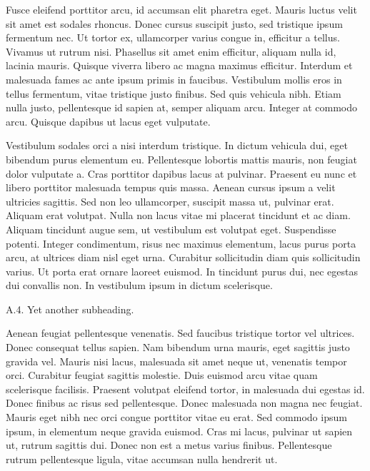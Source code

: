 \documentclass[11pt, notitlepage]{article} %
\begin{document}
Fusce eleifend porttitor arcu, id accumsan elit pharetra eget. Mauris luctus velit sit amet est sodales rhoncus. Donec cursus suscipit justo, sed tristique ipsum fermentum nec. Ut tortor ex, ullamcorper varius congue in, efficitur a tellus. Vivamus ut rutrum nisi. Phasellus sit amet enim efficitur, aliquam nulla id, lacinia mauris. Quisque viverra libero ac magna maximus efficitur. Interdum et malesuada fames ac ante ipsum primis in faucibus. Vestibulum mollis eros in tellus fermentum, vitae tristique justo finibus. Sed quis vehicula nibh. Etiam nulla justo, pellentesque id sapien at, semper aliquam arcu. Integer at commodo arcu. Quisque dapibus ut lacus eget vulputate.

Vestibulum sodales orci a nisi interdum tristique. In dictum vehicula dui, eget bibendum purus elementum eu. Pellentesque lobortis mattis mauris, non feugiat dolor vulputate a. Cras porttitor dapibus lacus at pulvinar. Praesent eu nunc et libero porttitor malesuada tempus quis massa. Aenean cursus ipsum a velit ultricies sagittis. Sed non leo ullamcorper, suscipit massa ut, pulvinar erat. Aliquam erat volutpat. Nulla non lacus vitae mi placerat tincidunt et ac diam. Aliquam tincidunt augue sem, ut vestibulum est volutpat eget. Suspendisse potenti. Integer condimentum, risus nec maximus elementum, lacus purus porta arcu, at ultrices diam nisl eget urna. Curabitur sollicitudin diam quis sollicitudin varius. Ut porta erat ornare laoreet euismod. In tincidunt purus dui, nec egestas dui convallis non. In vestibulum ipsum in dictum scelerisque.

\begin{description}
	\item[A.4. Yet another subheading.]{}
\end{description}

Aenean feugiat pellentesque venenatis. Sed faucibus tristique tortor vel ultrices. Donec consequat tellus sapien. Nam bibendum urna mauris, eget sagittis justo gravida vel. Mauris nisi lacus, malesuada sit amet neque ut, venenatis tempor orci. Curabitur feugiat sagittis molestie. Duis euismod arcu vitae quam scelerisque facilisis. Praesent volutpat eleifend tortor, in malesuada dui egestas id. Donec finibus ac risus sed pellentesque. Donec malesuada non magna nec feugiat. Mauris eget nibh nec orci congue porttitor vitae eu erat. Sed commodo ipsum ipsum, in elementum neque gravida euismod. Cras mi lacus, pulvinar ut sapien ut, rutrum sagittis dui. Donec non est a metus varius finibus. Pellentesque rutrum pellentesque ligula, vitae accumsan nulla hendrerit ut.
\end{document}
